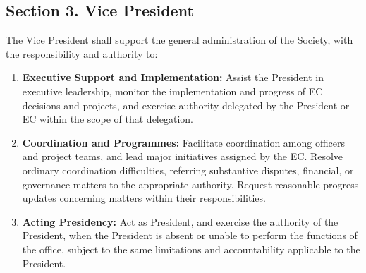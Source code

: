 \documentclass[a4paper]{article}
\begin{document}
\subsection*{Section 3. Vice President}
The Vice President shall support the general administration of the Society, with the responsibility and authority to:
\begin{enumerate}
  \item \textbf{Executive Support and Implementation:} Assist the President in executive leadership, monitor the implementation and progress of EC decisions and projects, and exercise authority delegated by the President or EC within the scope of that delegation.
  \item \textbf{Coordination and Programmes:} Facilitate coordination among officers and project teams, and lead major initiatives assigned by the EC. Resolve ordinary coordination difficulties, referring substantive disputes, financial, or governance matters to the appropriate authority. Request reasonable progress updates concerning matters within their responsibilities.
  \item \textbf{Acting Presidency:} Act as President, and exercise the authority of the President, when the President is absent or unable to perform the functions of the office, subject to the same limitations and accountability applicable to the President.
\end{enumerate}
\end{document}
